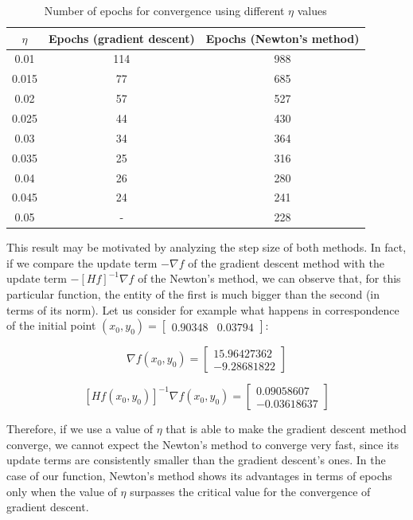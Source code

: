 \documentclass[letterpaper,headings=standardclasses]{scrartcl}
\begin{document}
\begin{table}[h]
\centering
\begin{tabular}{|c|c|c|}
\hline
$\eta$ & Epochs (gradient descent) & Epochs (Newton's method) \\ \hline
0.01 & 114 & 988 \\ \hline
0.015 & 77 & 685 \\ \hline
0.02 & 57 & 527 \\ \hline
0.025 & 44 & 430 \\ \hline
0.03 & 34 & 364 \\ \hline
0.035 & 25 & 316 \\ \hline
0.04 & 26 & 280 \\ \hline
0.045 & 24 & 241 \\ \hline
0.05 & - & 228 \\ \hline
\end{tabular}
\caption{Number of epochs for convergence using different $\eta$ values}
\label{var_eta_res}
\end{table}

This result may be motivated by analyzing the step size of both methods. In fact, if we compare the update term $-\nabla f$ of the gradient descent method with the update term $-[Hf]^{-1} \nabla f$ of the Newton's method, we can observe that, for this particular function, the entity of the first is much bigger than the second (in terms of its norm). Let us consider for example what happens in correspondence of the initial point $ (x_0, y_0) = [\begin{matrix} 0.90348 & 0.03794 \end{matrix}] $:

$$ \nabla f(x_0, y_0) = \left[ \begin{matrix} 15.96427362 \\ -9.28681822 \end{matrix} \right] $$

$$ [Hf(x_0, y_0)]^{-1} \nabla f(x_0, y_0) = \left[ \begin{matrix} 0.09058607 \\ -0.03618637 \end{matrix} \right] $$

Therefore, if we use a value of $\eta$ that is able to make the gradient descent method converge, we cannot expect the Newton's method to converge very fast, since its update terms are consistently smaller than the gradient descent's ones. In the case of our function, Newton's method shows its advantages in terms of epochs only when the value of $\eta$ surpasses the critical value for the convergence of gradient descent.
\end{document}
